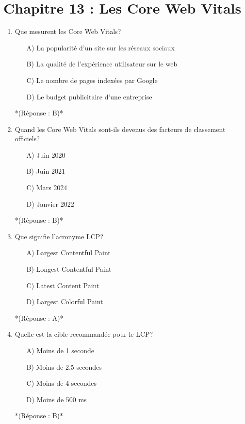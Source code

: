 \documentclass[12pt,a4paper,twoside]{report}
\begin{document}
\newpage

\section*{Chapitre 13 : Les Core Web Vitals}

\begin{enumerate}
\item Que mesurent les Core Web Vitals?
\begin{itemize}
\item[A)] La popularité d'un site sur les réseaux sociaux
\item[B)] La qualité de l'expérience utilisateur sur le web
\item[C)] Le nombre de pages indexées par Google
\item[D)] Le budget publicitaire d'une entreprise
\end{itemize}
*(Réponse : B)*

\item Quand les Core Web Vitals sont-ils devenus des facteurs de classement officiels?
\begin{itemize}
\item[A)] Juin 2020
\item[B)] Juin 2021
\item[C)] Mars 2024
\item[D)] Janvier 2022
\end{itemize}
*(Réponse : B)*

\item Que signifie l'acronyme LCP?
\begin{itemize}
\item[A)] Largest Contentful Paint
\item[B)] Longest Contentful Paint
\item[C)] Latest Content Paint
\item[D)] Largest Colorful Paint
\end{itemize}
*(Réponse : A)*

\item Quelle est la cible recommandée pour le LCP?
\begin{itemize}
\item[A)] Moins de 1 seconde
\item[B)] Moins de 2,5 secondes
\item[C)] Moins de 4 secondes
\item[D)] Moins de 500 ms
\end{itemize}
*(Réponse : B)*


\end{enumerate}
\end{document}
